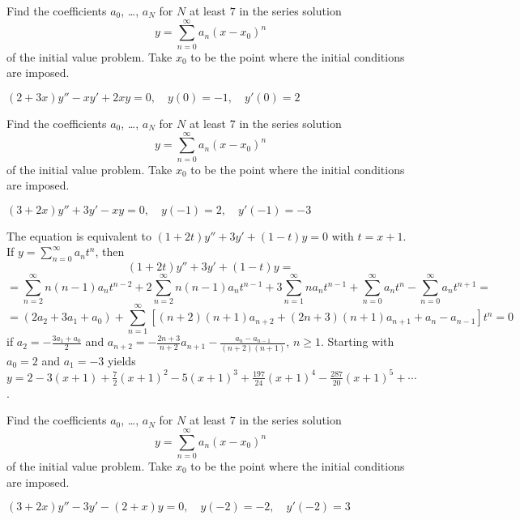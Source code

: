 \documentclass{ximera}
\begin{document}
\begin{problem}\label{exer:7.3.23}
Find
the coefficients  $a_0$, \dots, $a_N$  for $N$ at least $7$
in the series solution
$$
y=\sum_{n=0}^\infty a_n(x-x_0)^n
$$
of the
initial value problem. Take $x_0$ to be the point where the initial
conditions are imposed.

$(2+3x)y''-xy'+2xy=0,\quad y(0)=-1,\quad y'(0)=2$
\end{problem}

\begin{problem}\label{exer:7.3.24}
Find
the coefficients  $a_0$, \dots, $a_N$  for $N$ at least $7$
in the series solution
$$
y=\sum_{n=0}^\infty a_n(x-x_0)^n
$$
of the
initial value problem. Take $x_0$ to be the point where the initial
conditions are imposed.

$(3+2x)y''+3y'-xy=0,\quad y(-1)=2,\quad y'(-1)=-3$

\begin{solution}
    The equation is equivalent to
 $(1+2t)y''+3y'+(1-t)y=0$ with $t=x+1$.
If $y=\sum_{n=0}^\infty a_nt^n$, then
$$(1+2t)y''+3y'+(1-t)y=$$
$$=\sum_{n=2}^\infty n(n-1)a_nt^{n-2}
+2\sum_{n=2}^\infty n(n-1)a_nt^{n-1}
+3\sum_{n=1}^\infty na_nt^{n-1}
+\sum_{n=0}^\infty a_nt^n
-\sum_{n=0}^\infty a_nt^{n+1}=$$
$$=(2a_2+3a_1+a_0)+
\sum_{n=1}^\infty[(n+2)(n+1)a_{n+2}+(2n+3)(n+1)a_{n+1}
+a_n-a_{n-1}]t^n=0$$  if $a_2=-\frac{3a_1+a_0}{2}$ and
$a_{n+2}=-\frac{2n+3}{ n+2}a_{n+1}-\frac{a_n-a_{n-1}}{(n+2)(n+1)}$,
$n\geq 1$. Starting with $a_0=2$ and $a_1=-3$ yields
$y=2-3(x+1)+\frac{7}{2}(x+1)^2-5(x+1)^3+\frac{197}{24}(x+1)^4
-\frac{287}{20}(x+1)^5+\cdots$.
\end{solution}
\end{problem}

\begin{problem}\label{exer:7.3.25}
Find
the coefficients  $a_0$, \dots, $a_N$  for $N$ at least $7$
in the series solution
$$
y=\sum_{n=0}^\infty a_n(x-x_0)^n
$$
of the
initial value problem. Take $x_0$ to be the point where the initial
conditions are imposed.

$(3+2x)y''-3y'-(2+x)y=0,\quad y(-2)=-2,\quad y'(-2)=3$
\end{problem}
\end{document}
